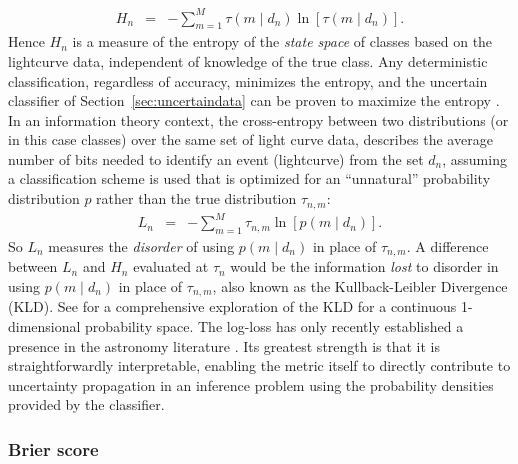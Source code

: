 \begin{eqnarray}
  \label{eq:entropy}
  H_{n} &=& -\sum_{m=1}^{M}\tau(m \mid d_{n})\ln[\tau(m \mid d_{n})].
\end{eqnarray}
Hence $H_n$ is a measure of the entropy of the \textit{state space} of classes based on the lightcurve data, independent of knowledge of the true class. Any deterministic classification, regardless of accuracy, minimizes the entropy, and the uncertain classifier of Section~\ref{sec:uncertaindata} can be proven to maximize the entropy \cite{murphy2012}.
In an information theory context, the cross-entropy between two distributions (or in this case classes) over the same set of light curve data, describes the average number of bits needed to identify an event (lightcurve) from the set $d_n$, assuming a classification scheme is used that is optimized for an ``unnatural'' probability distribution $p$ rather than the true distribution $\tau_{n,m}$:
\begin{eqnarray}
  \label{eq:logloss}
  L_{n} &=& -\sum_{m=1}^{M}\tau_{n, m}\ln[p(m \mid d_{n})].
\end{eqnarray}
So $L_n$ measures the \textit{disorder} of using $p(m \mid d_{n})$ in place of $\tau_{n, m}$.
A difference between $L_{n}$ and $H_{n}$ evaluated at $\tau_{n}$ would be the information \textit{lost} to disorder in using $p(m \mid d_{n})$ in place of $\tau_{n, m}$, also known as the Kullback-Leibler Divergence (KLD).
See \cite{2018AJ....156...35M} for a comprehensive exploration of the KLD for a continuous 1-dimensional probability space.
The log-loss has only recently established a presence in the astronomy literature \citep{hon_deep_2017, hon_deep_2018}.
Its greatest strength is that it is straightforwardly interpretable, enabling the metric itself to directly contribute to uncertainty propagation in an inference problem using the probability densities provided by the classifier.

\subsubsection{Brier score}
\label{sec:brier}

